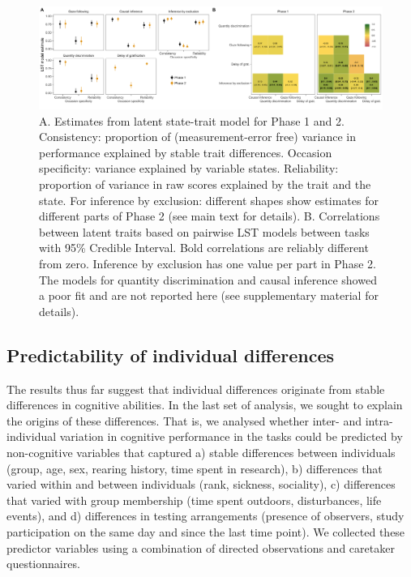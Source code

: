 \documentclass[
  man,floatsintext]{apa6}
\begin{document}
\begin{figure}
\includegraphics[width=1\linewidth]{./figures/lstm} \caption{A. Estimates from latent state-trait model for Phase 1 and 2. Consistency: proportion of (measurement-error free) variance in performance explained by stable trait differences. Occasion specificity: variance explained by variable states. Reliability: proportion of variance in raw scores explained by the trait and the state. For inference by exclusion: different shapes show estimates for different parts of Phase 2 (see main text for details). B. Correlations between latent traits based on pairwise LST models between tasks with 95\% Credible Interval. Bold correlations are reliably different from zero. Inference by exclusion has one value per part in Phase 2. The models for quantity discrimination and causal inference showed a poor fit and are not reported here (see supplementary material for details).}\label{fig:lstmplot}
\end{figure}

\hypertarget{predictability-of-individual-differences}{%
\subsection{Predictability of individual differences}\label{predictability-of-individual-differences}}

The results thus far suggest that individual differences originate from stable differences in cognitive abilities. In the last set of analysis, we sought to explain the origins of these differences. That is, we analysed whether inter- and intra-individual variation in cognitive performance in the tasks could be predicted by non-cognitive variables that captured a) stable differences between individuals (group, age, sex, rearing history, time spent in research), b) differences that varied within and between individuals (rank, sickness, sociality), c) differences that varied with group membership (time spent outdoors, disturbances, life events), and d) differences in testing arrangements (presence of observers, study participation on the same day and since the last time point). We collected these predictor variables using a combination of directed observations and caretaker questionnaires.
\end{document}
